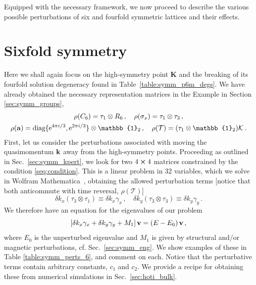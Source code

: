 Equipped with the necessary framework, we now proceed to describe the various possible perturbations of six and fourfold symmetric lattices and their effects.

\section{Sixfold symmetry} \label{sec:symm_sixfold}
Here we shall again focus on the high-symmetry point $\boldsymbol{K}$ and the breaking of its fourfold solution degeneracy found in Table~\ref{table:symm_p6m_degs}.
We have already obtained the necessary representation matrices in the Example in Section \ref{sec:symm_groups},
\begin{equation} \label{eq:symm_six_rhos}
\begin{gathered}
\rho(C_6) = \tau_1 \otimes R_6 \, , \quad  \rho(\sigma_x) = \tau_1 \otimes \tau_3 \, , \\
\rho(\vb{a}) = \text{diag}\{ \e^{4 \pi i /3}, \e^{2 \pi i / 3} \} \otimes \mathbb{1}_2 \, , \quad \rho(\mathcal{T}) = (\tau_1 \otimes \mathbb{1}_2) \mathcal{K} \,.
\end{gathered}
\end{equation}
First, let us consider the perturbations associated with moving the quasimomentum $\vb{k}$ away from the high-symmetry points. Proceeding as outlined in Sec.~\ref{sec:symm_kpert}, we look for two $4 \cross 4$ matrices constrained by the condition \eqref{seq:condition}. This is a linear problem in 32 variables, which we solve in Wolfram Mathematica~\cite{Mathematica}, obtaining the allowed perturbation terms [notice that both anticommute with time reversal, $\rho(\mathcal{T})$]
\begin{equation}
\delta k_x \left(\tau_3 \otimes \tau_1 \right) \equiv \delta k_x \gamma_x \,, \quad \delta  k_y \left(\tau_3 \otimes \tau_3 \right) \equiv \delta  k_y \gamma_y \,.
\end{equation} 
%
We therefore have an equation for the eigenvalues of our problem
%
\begin{equation} \label{eq:symm_ham}
\left[ \delta k_x \gamma_x + \delta k_y \gamma_y + M_1 \right] \vb{v} = (E-E_0) \,\vb{v} \,,
\end{equation}
where $E_0$ is the unperturbed eigenvalue and $M_1$ is given by structural and/or magnetic perturbations, cf. Sec.~\ref{sec:symm_eng}. We show examples of these in Table \ref{table:symm_perts_6}, and comment on each. Notice that the perturbative terms contain arbitrary constants, $c_1$ and $c_2$. We provide a recipe for obtaining these from numerical simulations in Sec.~\ref{sec:hoti_bulk}. 

